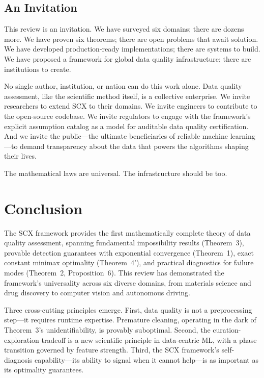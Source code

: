 \documentclass[twocolumn]{article}
\theoremstyle{definition}
\begin{document}
\subsection{An Invitation}

This review is an invitation. We have surveyed six domains; there are dozens more. We have proven six theorems; there are open problems that await solution. We have developed production-ready implementations; there are systems to build. We have proposed a framework for global data quality infrastructure; there are institutions to create.

No single author, institution, or nation can do this work alone. Data quality assessment, like the scientific method itself, is a collective enterprise. We invite researchers to extend SCX to their domains. We invite engineers to contribute to the open-source codebase. We invite regulators to engage with the framework's explicit assumption catalog as a model for auditable data quality certification. And we invite the public---the ultimate beneficiaries of reliable machine learning---to demand transparency about the data that powers the algorithms shaping their lives.

The mathematical laws are universal. The infrastructure should be too.

\section{Conclusion}

The SCX framework provides the first mathematically complete theory of data quality assessment, spanning fundamental impossibility results (Theorem~3), provable detection guarantees with exponential convergence (Theorem~1), exact constant minimax optimality (Theorem~4'), and practical diagnostics for failure modes (Theorem~2, Proposition~6). This review has demonstrated the framework's universality across six diverse domains, from materials science and drug discovery to computer vision and autonomous driving.

Three cross-cutting principles emerge. First, data quality is not a preprocessing step---it requires runtime expertise. Premature cleaning, operating in the dark of Theorem~3's unidentifiability, is provably suboptimal. Second, the curation-exploration tradeoff is a new scientific principle in data-centric ML, with a phase transition governed by feature strength. Third, the SCX framework's self-diagnosis capability---its ability to signal when it cannot help---is as important as its optimality guarantees.
\end{document}
